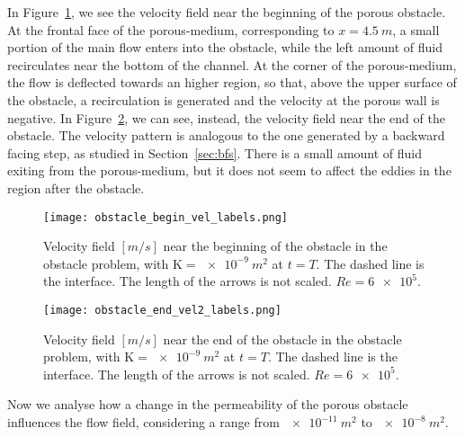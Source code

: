 In Figure~\ref{fig:obstacle_begin}, we see the velocity field near the beginning of the porous obstacle. At the frontal face of the porous-medium, corresponding to $x=\SI{4.5}{m}$, a small portion of the main flow enters into the obstacle, while the left amount of fluid recirculates near the bottom of the channel. At the corner of the porous-medium, the flow is deflected towards an higher region, so that, above the upper surface of the obstacle, a recirculation is generated and the velocity at the porous wall is negative.
In Figure~\ref{fig:obstacle_end}, we can see, instead, the velocity field near the end of the obstacle. The velocity pattern is analogous to the one generated by a backward facing step, as studied in Section~\ref{sec:bfs}. There is a small amount of fluid exiting from the porous-medium, but it does not seem to affect the eddies in the region after the obstacle.
\begin{figure}
	\centering
	\texttt{[image: obstacle\_begin\_vel\_labels.png]}
	\caption[Velocity field near the beginning of the obstacle in the obstacle problem]{Velocity field $[\si{m/s}]$ near the beginning of the obstacle in the obstacle problem, with $\mathrm{K} = \SI{e-9}{m^2}$ at $t=T$.
	The dashed line is the interface.
	The length of the arrows is not scaled. $Re = \num{6e5}$.}
	\label{fig:obstacle_begin}
\end{figure}
\begin{figure}
	\centering
	\texttt{[image: obstacle\_end\_vel2\_labels.png]}
	\caption[Velocity field near the end of the obstacle in the obstacle problem]{Velocity field $[\si{m/s}]$ near the end of the obstacle in the obstacle problem, with $\mathrm{K} = \SI{e-9}{m^2}$ at $t=T$.
	The dashed line is the interface.
	The length of the arrows is not scaled. $Re = \num{6e5}$.}
	\label{fig:obstacle_end}
\end{figure}

Now we analyse how a change in the permeability of the porous obstacle influences the flow field, considering a range from $\SI{e-11}{m^2}$ to $\SI{e-8}{m^2}$.

